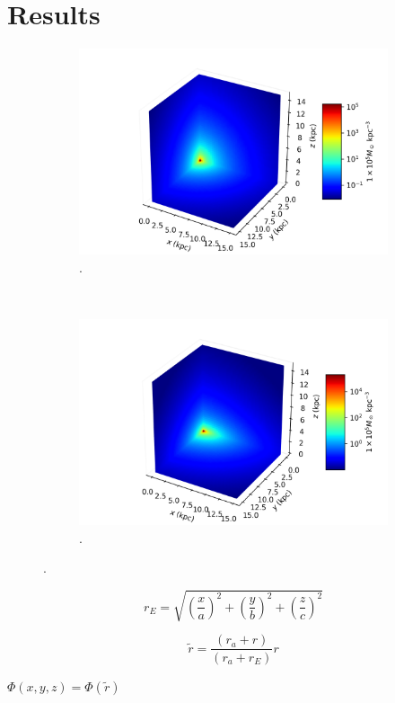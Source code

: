 	\section{Results}
	\begin{figure}[h]
		\centering
		\begin{subfigure}[b]{0.49\textwidth}
			\includegraphics[width = \textwidth]{"../Files/Week 7/symmetric"}
			\caption{.}
			\label{fig: symmetricDensity3d}
		\end{subfigure}
		~ 
		\begin{subfigure}[b]{0.49\textwidth}
			\includegraphics[width=\textwidth]{"../Files/Week 7/triaxial"}
			\caption{.}
			\label{fig: triaxialDensity3d}
		\end{subfigure}
		\caption{.}
		\label{fig: symmetricTriaxial}
	\end{figure}

	\begin{equation}
		r_E = \sqrt{\left(\dfrac{x}{a}\right)^2 + \left(\dfrac{y}{b}\right)^2 + \left(\dfrac{z}{c}\right)^2}
	\end{equation}
	
	\begin{equation}
		\tilde{r} = \dfrac{(r_a + r)}{(r_a + r_E)}r
	\end{equation}
	
	$\Phi(x, y, z) = \Phi(\tilde{r})$ \cite{vogelsberger2008fine}